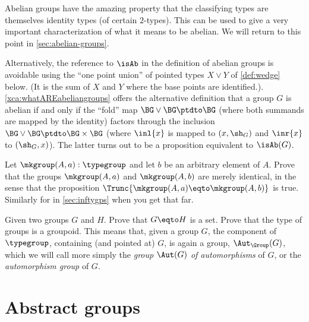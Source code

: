 \begin{remark}
  \label{rem:whatAREabeliangroups}

  Abelian groups have the amazing property that the classifying types are themselves identity types (of certain $2$-types).
  This can be used to give a very important characterization of what it means to be abelian.
  We will return to this point in \cref{sec:abelian-groups}.

  Alternatively, the reference to $\isAb$ in the definition of abelian groups is avoidable using the ``one point union'' of pointed types $X\vee Y$ of \cref{def:wedge} below. (It is the sum of $X$ and $Y$ where the base points are identified.). \cref{xca:whatAREabeliangroups}
offers the alternative definition that a group $G$ is abelian if and only if
the ``fold'' map $\BG\vee \BG\ptdto \BG$ (where both summands are mapped by
the identity) factors through the inclusion $\BG\vee\BG\ptdto\BG\times\BG$
(where $\inl{x}$ is mapped to $(x,\sh_G)$ and $\inr{x}$ to $(\sh_G,x)$).
The latter turns out to be a proposition equivalent to $\isAb(G)$.
\end{remark}

\begin{xca}
  Let $\mkgroup(A,a):\typegroup$ and let $b$ be an arbitrary element of $A$.
  Prove that the groups $\mkgroup(A,a)$ and $\mkgroup(A,b)$ are 
  merely identical, in the sense that the proposition
  $\Trunc{\mkgroup(A,a)\eqto\mkgroup(A,b)}$ is true.
  Similarly for \inftygps in \cref{sec:inftygps} when you get that far.
\end{xca}

  \begin{xca}\label{xca:typegroupisgroupoid}
    Given two groups $G$ and $H$.  Prove that $G\eqto H$ is a set.
    Prove that the type of groups is a groupoid.
    This means that, given a group $G$, the component of $\typegroup$,
    containing (and pointed at) $G$, is again a group, $\Aut_\Group(G)$,
    which we will call more simply the \emph{group $\Aut(G)$ of automorphisms}%
     of $G$,
    or the \emph{automorphism group} of $G$.
  \end{xca}

\section{Abstract groups}
\label{sec:identity-type-as-abstract}

